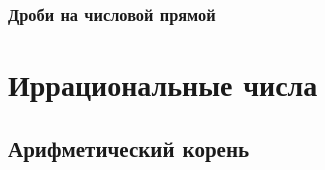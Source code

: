 \documentclass[10pt, a4paper]{article}
\begin{document}
		\subsubsection{Дроби на числовой прямой}
\section{Иррациональные числа}
	\subsection{Арифметический корень}
\end{document}
